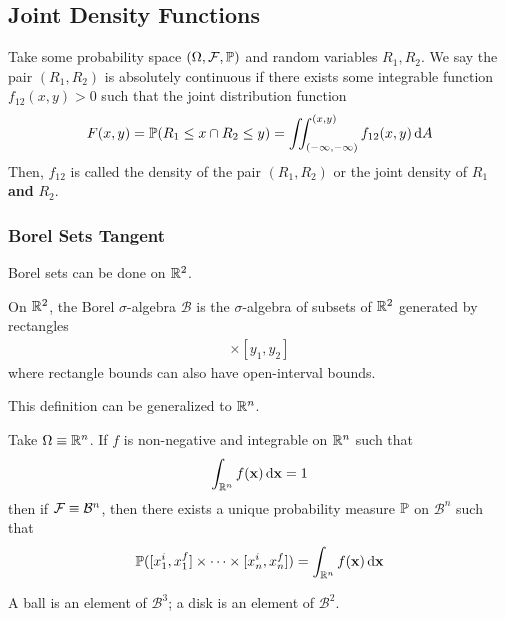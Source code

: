 \subsection{Joint Density Functions}
\begin{definition}
    Take some probability space $(\Omega, \mathcal{F}, \mathbb{P})$ and random variables $R_1, R_2$. We say the pair $(R_1, R_2)$ is absolutely continuous if there exists some integrable function $f_{12}(x,y) > 0$ such that the joint distribution function
    \begin{align}
        F(x,y) = \mathbb{P}(R_1 \le x \cap R_2 \le y) = \iint_{(-\infty,-\infty)}^{(x,y)} f_{12}(x,y) \dd{A}
    \end{align}
    Then, $f_{12}$ is called the density of the pair $(R_1, R_2)$ or the joint density of $R_1$ \textbf{and} $R_2$.    
\end{definition}

\subsubsection{Borel Sets Tangent}
Borel sets can be done on $\mathbb{R}^2$.
\begin{definition}
    On $\mathbb{R}^2$, the Borel $\sigma$-algebra $\mathcal{B}$ is the $\sigma$-algebra of subsets of $\mathbb{R}^2$ generated by rectangles
    \begin{align}
        [x_1, x_2] \times [y_1, y_2]
    \end{align}
    where rectangle bounds can also have open-interval bounds.
\end{definition}
This definition can be generalized to $\mathbb{R}^n$.
\begin{proposition}
    Take $\Omega \equiv \mathbb{R}^n$. If $f$ is non-negative and integrable on $\mathbb{R}^n$ such that
    \begin{align}
        \int_{\mathbb{R}^n} f(\vb{x}) \dd{\vb{x}} = 1
    \end{align}
    then if $\mathcal{F} \equiv \mathcal{B}^n$, then there exists a unique probability measure $\mathbb{P}$ on $\mathcal{B}^n$ such that
    \begin{align}
        \mathbb{P}([x_1^i, x_1^f] \times \cdots \times [x_n^i, x_n^f]) = \int_{\mathbb{R}^n} f(\vb{x}) \dd{\vb{x}}
    \end{align}
\end{proposition}

\begin{lemma}
    A ball is an element of $\mathcal{B}^3$; a disk is an element of $\mathcal{B}^2$.
\end{lemma}

